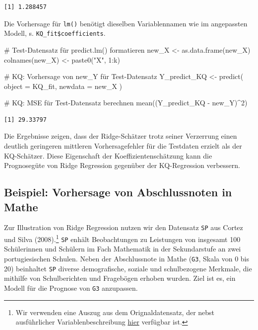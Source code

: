 \documentclass[
  a4paper,
  DIV=11,
  oneside]{scrreprt}
\newenvironment{Shaded}{\begin{snugshade}}{\end{snugshade}}
\newcommand{\AttributeTok}[1]{\textcolor[rgb]{0.40,0.45,0.13}{#1}}
\newcommand{\CommentTok}[1]{\textcolor[rgb]{0.37,0.37,0.37}{#1}}
\newcommand{\DecValTok}[1]{\textcolor[rgb]{0.68,0.00,0.00}{#1}}
\newcommand{\FunctionTok}[1]{\textcolor[rgb]{0.28,0.35,0.67}{#1}}
\newcommand{\NormalTok}[1]{\textcolor[rgb]{0.00,0.23,0.31}{#1}}
\newcommand{\OtherTok}[1]{\textcolor[rgb]{0.00,0.23,0.31}{#1}}
\newcommand{\SpecialCharTok}[1]{\textcolor[rgb]{0.37,0.37,0.37}{#1}}
\newcommand{\StringTok}[1]{\textcolor[rgb]{0.13,0.47,0.30}{#1}}
\begin{document}
\begin{verbatim}
[1] 1.288457
\end{verbatim}

Die Vorhersage für \texttt{lm()} benötigt dieselben Variablennamen wie
im angepassten Modell, s. \texttt{KQ\_fit\$coefficients}.

\begin{Shaded}
\begin{Highlighting}[]
\CommentTok{\# Test{-}Datensatz für predict.lm() formatieren}
\NormalTok{new\_X }\OtherTok{\textless{}{-}} \FunctionTok{as.data.frame}\NormalTok{(new\_X)}
\FunctionTok{colnames}\NormalTok{(new\_X) }\OtherTok{\textless{}{-}} \FunctionTok{paste0}\NormalTok{(}\StringTok{"X"}\NormalTok{, }\DecValTok{1}\SpecialCharTok{:}\NormalTok{k)}

\CommentTok{\# KQ: Vorhersage von new\_Y für Test{-}Datensatz}
\NormalTok{Y\_predict\_KQ }\OtherTok{\textless{}{-}} \FunctionTok{predict}\NormalTok{(}
  \AttributeTok{object =}\NormalTok{ KQ\_fit, }
  \AttributeTok{newdata =}\NormalTok{ new\_X}
\NormalTok{)}

\CommentTok{\# KQ: MSE für Test{-}Datensatz berechnen}
\FunctionTok{mean}\NormalTok{((Y\_predict\_KQ }\SpecialCharTok{{-}}\NormalTok{ new\_Y)}\SpecialCharTok{\^{}}\DecValTok{2}\NormalTok{)}
\end{Highlighting}
\end{Shaded}

\begin{verbatim}
[1] 29.33797
\end{verbatim}

Die Ergebnisse zeigen, dass der Ridge-Schätzer trotz seiner Verzerrung
einen deutlich geringeren mittleren Vorhersagefehler für die Testdaten
erzielt als der KQ-Schätzer. Diese Eigenschaft der
Koeffizientenschätzung kann die Prognosegüte von Ridge Regression
gegenüber der KQ-Regression verbessern.

\subsection{Beispiel: Vorhersage von Abschlussnoten in
Mathe}\label{beispiel-vorhersage-von-abschlussnoten-in-mathe}

Zur Illustration von Ridge Regression nutzen wir den Datensatz
\texttt{SP} aus Cortez und Silva (2008).\footnote{Wir verwenden eine
  Auszug aus dem Orignaldatensatz, der nebst ausführlicher
  Variablenbeschreibung
  \href{https://archive.ics.uci.edu/dataset/320/student+performance}{hier}
  verfügbar ist.} \texttt{SP} enhält Beobachtungen zu Leistungen von
insgesamt 100 Schülerinnen und Schülern im Fach Mathematik in der
Sekundarstufe an zwei portugiesischen Schulen. Neben der Abschlussnote
in Mathe (\texttt{G3}, Skala von 0 bis 20) beinhaltet \texttt{SP}
diverse demografische, soziale und schulbezogene Merkmale, die mithilfe
von Schulberichten und Fragebögen erhoben wurden. Ziel ist es, ein
Modell für die Prognose von \texttt{G3} anzupassen.
\end{document}
